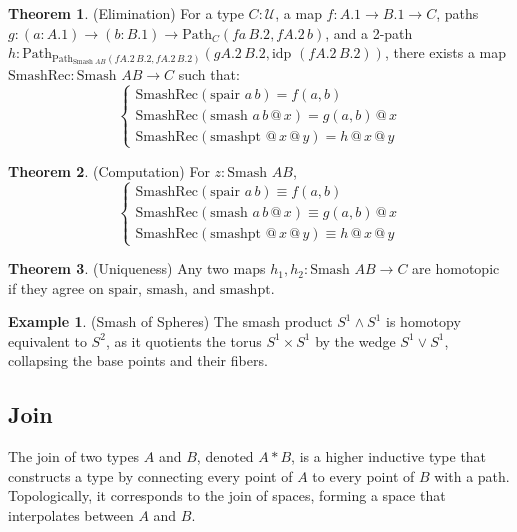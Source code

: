 \documentclass{article}
\theoremstyle{definition}
\newtheorem{theorem}{Theorem}
\newtheorem{example}{Example}
\begin{document}
\begin{theorem} (Elimination)
For a type $C : \mathcal{U}$, a map $f : A.1 \to B.1 \to C$,
paths $g : (a : A.1) \to (b : B.1) \to \text{Path}_C (f a \, B.2, f A.2 \, b)$,
and a 2-path $h : \text{Path}_{\text{Path}_{\text{Smash } A B} (f A.2 \, B.2, f A.2 \, B.2)} (g A.2 \, B.2, \text{idp } (f A.2 \, B.2))$,
there exists a map $\text{SmashRec} : \text{Smash } A B \to C$ such that:
\[
\begin{cases}
\text{SmashRec}(\text{spair } a \, b) = f(a, b) \\
\text{SmashRec}(\text{smash } a \, b \, @ \, x) = g(a, b) \, @ \, x \\
\text{SmashRec}(\text{smashpt } @ \, x \, @ \, y) = h \, @ \, x \, @ \, y
\end{cases}
\]
\end{theorem}

\begin{theorem} (Computation)
For $z : \text{Smash } A B$,
\[
\begin{cases}
\text{SmashRec}(\text{spair } a \, b) \equiv f(a, b) \\
\text{SmashRec}(\text{smash } a \, b \, @ \, x) \equiv g(a, b) \, @ \, x \\
\text{SmashRec}(\text{smashpt } @ \, x \, @ \, y) \equiv h \, @ \, x \, @ \, y
\end{cases}
\]
\end{theorem}

\begin{theorem} (Uniqueness)
Any two maps $h_1, h_2 : \text{Smash } A B \to C$ are homotopic
if they agree on $\text{spair}$, $\text{smash}$, and $\text{smashpt}$.
\end{theorem}

\begin{example} (Smash of Spheres)
The smash product $S^1 \wedge S^1$ is homotopy equivalent to $S^2$,
as it quotients the torus $S^1 \times S^1$ by the wedge $S^1 \vee S^1$,
collapsing the base points and their fibers.
\end{example}

\newpage
\subsection{Join}
The join of two types $A$ and $B$, denoted $A * B$,
is a higher inductive type that constructs a type by
connecting every point of $A$ to every point of $B$ with a path.
Topologically, it corresponds to the join of spaces, forming a
space that interpolates between $A$ and $B$.
\end{document}
